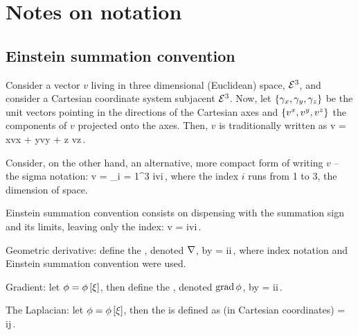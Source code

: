 \section{Notes on notation}

\subsection{Einstein summation convention}
Consider a vector $v$ living in three dimensional (Euclidean) space, $\mathcal{\mathcal{E}}^{3}$, and consider a Cartesian coordinate system subjacent $\mathcal{\mathcal{E}}^{3}$. Now, let $\left\lbrace{\gamma_{x}, \gamma_{y}, \gamma_{z}}\right\rbrace$ be the unit vectors pointing in the directions of the Cartesian axes and $\left\lbrace{{v}^{x}, {v}^{y}, {v}^{z}}\right\rbrace$ the components of $v$ projected onto the axes. Then, $v$ is traditionally written as
\beq
v = \fbvec x\fvec vx + \fbvec y\fvec vy + \fbvec z \fvec vz\,.
\eeq

Consider, on the other hand, an alternative, more compact form of writing $v$ -- the sigma notation:
\beq
v = \sum_{i = 1}^3 \fbvec i\fvec vi\,,
\eeq
where the index $i$ runs from 1 to 3, the dimension of space.

Einstein summation convention consists on dispensing with the summation sign and its limits, leaving only the index:
\beq
v = \fbvec i\fvec vi\,.
\eeq

Geometric derivative: define the , denoted $\nabla$, by
\beq
\gder = \rbvec i\igd i\,,
\eeq
where index notation and Einstein summation convention were used.

Gradient: let $\phi = \phi\left[{\xi}\right]$, then define the , denoted $\operatorname{grad}\phi$, by
\beq
\grad\phi = \rbvec i\igd i\phi\,.
\eeq

The Laplacian: let $\phi = \phi\left[{\xi}\right]$, then the  is defined as (in Cartesian coordinates)
\beq
\lap\phi = \igd i\igd j\phi\,.
\eeq

